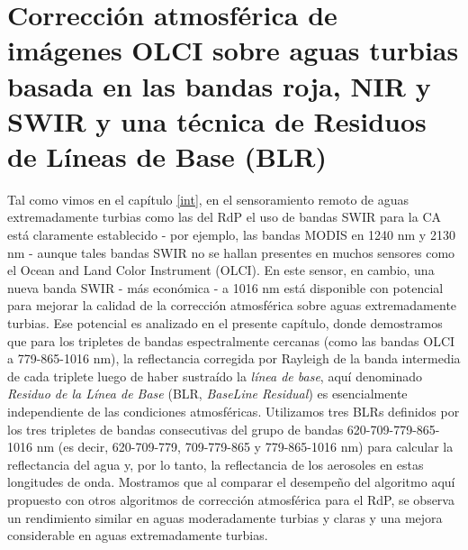 \chapter[CA sobre imágenes OLCI basada en BLRs]{Corrección atmosférica de imágenes OLCI sobre aguas turbias basada en las bandas roja, NIR y SWIR y una técnica de Residuos de Líneas de Base (BLR)}
\label{blr}

%
Tal como vimos en el capítulo \ref{int}, en el sensoramiento remoto de aguas extremadamente turbias como las del RdP el uso de bandas SWIR para la CA está claramente establecido - por ejemplo, las bandas MODIS en 1240 nm y 2130 nm - aunque tales bandas SWIR no se hallan presentes en muchos sensores como el Ocean and Land Color Instrument (OLCI). En este sensor, en cambio, una nueva banda SWIR - más económica - a 1016 nm está disponible con potencial para mejorar la calidad de la corrección atmosférica sobre aguas extremadamente turbias. Ese potencial es analizado en el presente capítulo, donde demostramos que para los tripletes de bandas espectralmente cercanas (como las bandas OLCI a 779-865-1016 nm), la reflectancia corregida por Rayleigh de la banda intermedia de cada triplete luego de haber sustraído la \textit{línea de base}, aquí denominado \textit{Residuo de la Línea de Base} (BLR, \textit{BaseLine Residual}) es esencialmente independiente de las condiciones atmosféricas. Utilizamos tres BLRs definidos por los tres tripletes de bandas consecutivas del grupo de bandas 620-709-779-865-1016 nm (es decir, 620-709-779, 709-779-865 y 779-865-1016 nm) para calcular la reflectancia del agua y, por lo tanto, la reflectancia de los aerosoles en estas longitudes de onda. Mostramos que al comparar el desempeño del algoritmo aquí propuesto con otros algoritmos de corrección atmosférica para el RdP, se observa un rendimiento similar en aguas moderadamente turbias y claras y una mejora considerable en aguas extremadamente turbias.

